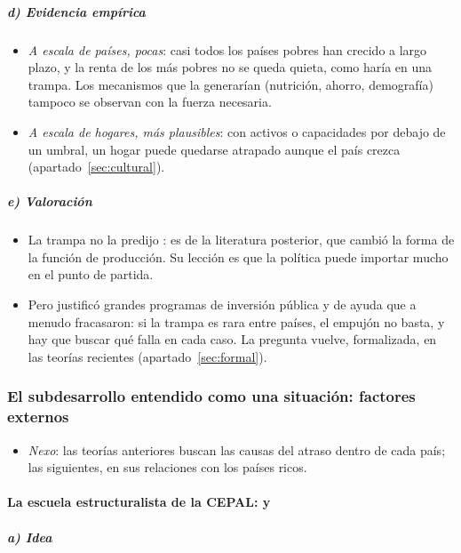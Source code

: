 \documentclass[11pt]{article}
\begin{document}
\subparagraph{d) Evidencia empírica}

\begin{itemize}
\item \emph{A escala de países, pocas}: casi todos los países pobres han crecido a largo plazo, y la renta de los más pobres no se queda quieta, como haría en una trampa\nocite{KraayMcKenzie2014Do}. Los mecanismos que la generarían (nutrición, ahorro, demografía) tampoco se observan con la fuerza necesaria\nocite{Campante2021}.
\item \emph{A escala de hogares, más plausibles}: con activos o capacidades por debajo de un umbral, un hogar puede quedarse atrapado aunque el país crezca (apartado~\ref{sec:cultural}).
\end{itemize}

\subparagraph{e) Valoración}

\begin{itemize}
\item La trampa no la predijo : es de la literatura posterior, que cambió la forma de la función de producción. Su lección es que la política puede importar mucho en el punto de partida.
\item Pero justificó grandes programas de inversión pública y de ayuda que a menudo fracasaron: si la trampa es rara entre países, el empujón no basta, y hay que buscar qué falla en cada caso. La pregunta vuelve, formalizada, en las teorías recientes (apartado~\ref{sec:formal}).
\end{itemize}

\subsubsection{El subdesarrollo entendido como una situación: factores externos}\label{sec:externos}

\begin{itemize}
\item \emph{Nexo}: las teorías anteriores buscan las causas del atraso dentro de cada país; las siguientes, en sus relaciones con los países ricos.
\end{itemize}

\paragraph{La escuela estructuralista de la CEPAL:  y }

\subparagraph{a) Idea}
\end{document}
